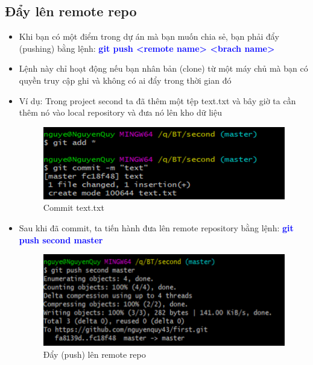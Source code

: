 \documentclass[12pt,a4paper]{report}
\begin{document}
\subsection{Đẩy lên remote repo}
\begin{itemize}
\item Khi bạn có một điểm trong dự án mà bạn muốn chia sẻ, bạn phải đẩy (pushing) bằng lệnh: \textcolor{blue}{\bf git push <remote name> <brach name> }
\item Lệnh này chỉ hoạt động nếu bạn nhân bản (clone) từ một máy chủ mà bạn có quyền truy cập ghi và không có ai đẩy trong thời gian đó
\item Ví dụ: Trong project second ta đã thêm một tệp text.txt và bây giờ ta cần thêm nó vào local repository và đưa nó lên kho dữ liệu

\begin{figure}[!ht]
	\centering
	\includegraphics[width=0.8\linewidth]{screenshot038}
\caption{Commit text.txt}
	\label{fig:screenshot038}
\end{figure}

\item Sau khi đã commit, ta tiến hành đưa lên remote repository bằng lệnh: \textcolor{blue}{\bf git push second master}

\begin{figure}[!ht]
	\centering
	\includegraphics[width=0.8\linewidth]{screenshot039}
\caption{Đẩy (push) lên remote repo}
	\label{fig:screenshot039}
	\end{figure}
\end{itemize}	
\end{document}
